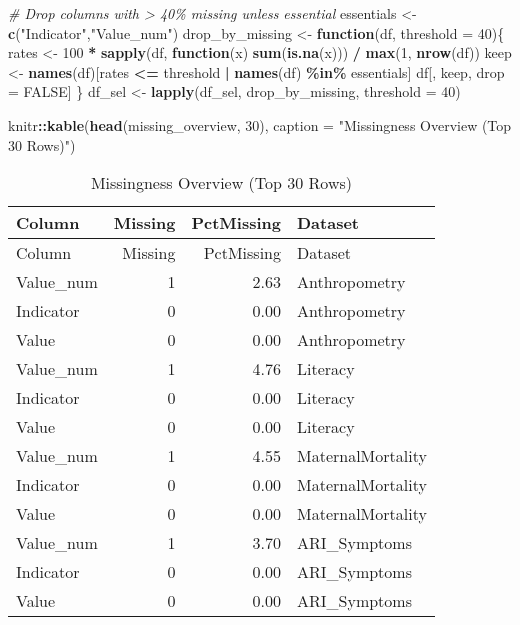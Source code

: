 \documentclass[
]{article}
\newenvironment{Shaded}{\begin{snugshade}}{\end{snugshade}}
\newcommand{\AttributeTok}[1]{\textcolor[rgb]{0.13,0.29,0.53}{#1}}
\newcommand{\CommentTok}[1]{\textcolor[rgb]{0.56,0.35,0.01}{\textit{#1}}}
\newcommand{\ConstantTok}[1]{\textcolor[rgb]{0.56,0.35,0.01}{#1}}
\newcommand{\ControlFlowTok}[1]{\textcolor[rgb]{0.13,0.29,0.53}{\textbf{#1}}}
\newcommand{\DecValTok}[1]{\textcolor[rgb]{0.00,0.00,0.81}{#1}}
\newcommand{\FunctionTok}[1]{\textcolor[rgb]{0.13,0.29,0.53}{\textbf{#1}}}
\newcommand{\NormalTok}[1]{#1}
\newcommand{\OtherTok}[1]{\textcolor[rgb]{0.56,0.35,0.01}{#1}}
\newcommand{\SpecialCharTok}[1]{\textcolor[rgb]{0.81,0.36,0.00}{\textbf{#1}}}
\newcommand{\StringTok}[1]{\textcolor[rgb]{0.31,0.60,0.02}{#1}}
\begin{document}
\begin{Shaded}
\begin{Highlighting}[]
\CommentTok{\# Drop columns with \textgreater{} 40\% missing unless essential}
\NormalTok{essentials }\OtherTok{\textless{}{-}} \FunctionTok{c}\NormalTok{(}\StringTok{"Indicator"}\NormalTok{,}\StringTok{"Value\_num"}\NormalTok{)}
\NormalTok{drop\_by\_missing }\OtherTok{\textless{}{-}} \ControlFlowTok{function}\NormalTok{(df, }\AttributeTok{threshold =} \DecValTok{40}\NormalTok{)\{}
\NormalTok{  rates }\OtherTok{\textless{}{-}} \DecValTok{100} \SpecialCharTok{*} \FunctionTok{sapply}\NormalTok{(df, }\ControlFlowTok{function}\NormalTok{(x) }\FunctionTok{sum}\NormalTok{(}\FunctionTok{is.na}\NormalTok{(x))) }\SpecialCharTok{/} \FunctionTok{max}\NormalTok{(}\DecValTok{1}\NormalTok{, }\FunctionTok{nrow}\NormalTok{(df))}
\NormalTok{  keep }\OtherTok{\textless{}{-}} \FunctionTok{names}\NormalTok{(df)[rates }\SpecialCharTok{\textless{}=}\NormalTok{ threshold }\SpecialCharTok{|} \FunctionTok{names}\NormalTok{(df) }\SpecialCharTok{\%in\%}\NormalTok{ essentials]}
\NormalTok{  df[, keep, drop }\OtherTok{=} \ConstantTok{FALSE}\NormalTok{]}
\NormalTok{\}}
\NormalTok{df\_sel }\OtherTok{\textless{}{-}} \FunctionTok{lapply}\NormalTok{(df\_sel, drop\_by\_missing, }\AttributeTok{threshold =} \DecValTok{40}\NormalTok{)}

\NormalTok{knitr}\SpecialCharTok{::}\FunctionTok{kable}\NormalTok{(}\FunctionTok{head}\NormalTok{(missing\_overview, }\DecValTok{30}\NormalTok{), }\AttributeTok{caption =} \StringTok{"Missingness Overview (Top 30 Rows)"}\NormalTok{)}
\end{Highlighting}
\end{Shaded}

\begin{longtable}[]{@{}lrrl@{}}
\caption{Missingness Overview (Top 30 Rows)}\tabularnewline
\toprule\noalign{}
Column & Missing & PctMissing & Dataset \\
\midrule\noalign{}
\endfirsthead
\toprule\noalign{}
Column & Missing & PctMissing & Dataset \\
\midrule\noalign{}
\endhead
\bottomrule\noalign{}
\endlastfoot
Value\_num & 1 & 2.63 & Anthropometry \\
Indicator & 0 & 0.00 & Anthropometry \\
Value & 0 & 0.00 & Anthropometry \\
Value\_num & 1 & 4.76 & Literacy \\
Indicator & 0 & 0.00 & Literacy \\
Value & 0 & 0.00 & Literacy \\
Value\_num & 1 & 4.55 & MaternalMortality \\
Indicator & 0 & 0.00 & MaternalMortality \\
Value & 0 & 0.00 & MaternalMortality \\
Value\_num & 1 & 3.70 & ARI\_Symptoms \\
Indicator & 0 & 0.00 & ARI\_Symptoms \\
Value & 0 & 0.00 & ARI\_Symptoms \\
\end{longtable}
\end{document}
